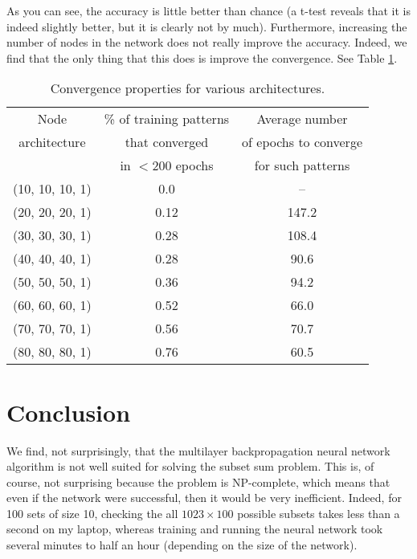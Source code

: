 \documentclass[12pt]{article}
\begin{document}
As you can see, the accuracy is little better than chance (a t-test reveals that it is indeed slightly better, but it is clearly not by much).  Furthermore, increasing the number of nodes in the network does not really improve the accuracy.  Indeed, we find that the only thing that this does is improve the convergence.  See Table \ref{Convergence-Table}.
\begin{table}[h!]
    \begin{center}
    \begin{tabular}{|c|c|c|}
        \hline
        Node & \% of training patterns & Average number \\
        architecture &  that converged & of epochs to converge\\
         & in $< 200$ epochs &  for such patterns\\
        \hline
        (10, 10, 10, 1) & 0.0 & --\\
        \hline
        (20, 20, 20, 1) & 0.12 & 147.2\\
        \hline
        (30, 30, 30, 1) & 0.28 & 108.4\\
        \hline
        (40, 40, 40, 1) & 0.28 & 90.6\\
        \hline
        (50, 50, 50, 1) & 0.36 & 94.2\\
        \hline
        (60, 60, 60, 1) & 0.52 & 66.0\\
        \hline
        (70, 70, 70, 1) & 0.56 & 70.7\\
        \hline
        (80, 80, 80, 1) & 0.76 & 60.5\\
        \hline
    \end{tabular}
    \end{center}
    \caption{Convergence properties for various architectures.}
    \label{Convergence-Table}
\end{table}

\section{Conclusion}
We find, not surprisingly, that the multilayer backpropagation neural network algorithm is not well suited for solving the subset sum problem.  This is, of course, not surprising because the problem is NP-complete, which means that even if the network were successful, then it would be very inefficient.  Indeed, for 100 sets of size 10, checking the all $1023\times 100$ possible subsets takes less than a second on my laptop, whereas training and running the neural network took several minutes to half an hour (depending on the size of the network).
\end{document}
